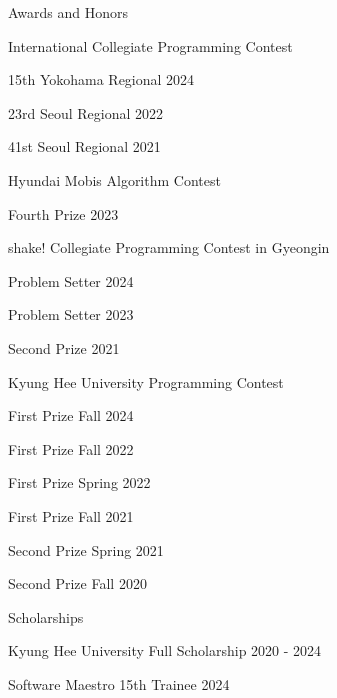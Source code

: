 \documentclass{resume}
\begin{document}
\begin{rSection}{Awards and Honors}

  \begin{rSubsection}{International Collegiate Programming Contest}{}{}{}
    \item 15th \hfill Yokohama Regional 2024
    \item 23rd \hfill Seoul Regional 2022
    \item 41st \hfill Seoul Regional 2021
  \end{rSubsection}

  \begin{rSubsection}{Hyundai Mobis Algorithm Contest}{}{}{}
    \item Fourth Prize \hfill 2023
  \end{rSubsection}

  \begin{rSubsection}{shake! Collegiate Programming Contest in Gyeongin}{}{}{}
    \item Problem Setter \hfill 2024
    \item Problem Setter \hfill 2023
    \item Second Prize \hfill 2021
  \end{rSubsection}

  \begin{rSubsection}{Kyung Hee University Programming Contest}{}{}{}
    \item First Prize \hfill Fall 2024
    \item First Prize \hfill Fall 2022
    \item First Prize \hfill Spring 2022
    \item First Prize \hfill Fall 2021
    \item Second Prize \hfill Spring 2021
    \item Second Prize \hfill Fall 2020
  \end{rSubsection}

  \begin{rSubsection}{Scholarships}{}{}{}
    \item Kyung Hee University Full Scholarship \hfill 2020 - 2024
    \item Software Maestro 15th Trainee \hfill 2024
  \end{rSubsection}


\end{rSection}
\end{document}
